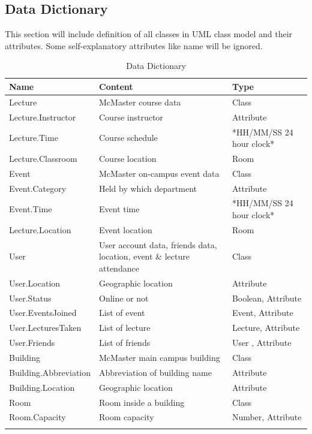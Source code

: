 \documentclass[12pt]{article}
\begin{document}
\subsection{Data Dictionary}
This section will include definition of all classes in UML class model and their attributes. Some self-explanatory attributes like name will be ignored.
\begin{longtable}
 {p{} | p{} | p{}}
  \toprule
  \textbf{Name} & \textbf{Content} & \textbf{Type}\\
  \midrule
  Lecture & McMaster course data & Class\\
  \midrule
  Lecture.Instructor & Course instructor & Attribute\\
  \midrule
  Lecture.Time & Course schedule & *HH/MM/SS
24 hour clock*\\
  \midrule
  Lecture.Classroom & Course location & Room\\
  \midrule
  Event & McMaster on-campus event data & Class\\
  \midrule
  Event.Category & Held by which department & Attribute\\
  \midrule
  Event.Time & Event time & *HH/MM/SS
24 hour clock*\\
  \midrule
  Lecture.Location & Event location & Room\\
  \midrule
  User & User account data, friends data, location,  event \& lecture attendance & Class\\
  \midrule
  User.Location & Geographic location & Attribute\\
  \midrule
  User.Status & Online or not & Boolean, Attribute\\
  \midrule
  User.EventsJoined & List of event & Event, Attribute\\
  \midrule
  User.LecturesTaken & List of lecture & Lecture, Attribute\\
  \midrule
  User.Friends & List of friends & User , Attribute\\
  \midrule
  Building & McMaster main campus building & Class\\
  \midrule
  Building.Abbreviation & Abbreviation of building name & Attribute\\
  \midrule
  Building.Location & Geographic location & Attribute\\
  \midrule
  Room & Room inside a building & Class\\
  \midrule
  Room.Capacity & Room capacity & Number, Attribute\\
  \bottomrule
  \caption{Data Dictionary} \label{TblDataDict}\\
\end{longtable}
\end{document}
